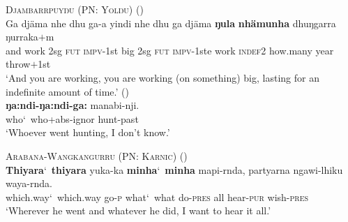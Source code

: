 \documentclass{article}
\begin{document}
\begin{exe}
  \ex \textsc{Djambarrpuyŋu (PN: Yolŋu)} (\citealt[393]{wilkinson91})\\
  \gll %
  Ga     djäma    nhe    dhu    ga-a        yindi    nhe    dhu    ga     djäma    \textbf{ŋula}        \textbf{nhämunha}    dhuŋgarra    ŋurraka$+$m\\
  and    work    2sg    \textsc{fut}    \textsc{impv}-1st    big    2sg    \textsc{fut}    \textsc{impv}-1ste   work    \textsc{indef2}    how.many    year        throw$+$1st\\
  \glt `And you are working, you are working (on something) big, lasting for an indefinite amount of time.'
   (\citealt[271]{donaldson80}) \\
\gll \textbf{ŋa:ndi-ŋa:ndi-ga:} manabi-nji.\\
who\char`~who+{\sc abs}-{\sc ignor} hunt-{\sc past}\\
\glt `Whoever went hunting, I don't know.' 

  
  \ex \textsc{Arabana-Wangkangurru (PN: Karnic)} (\citealt[129]{hercus94})\\
  \gll \textbf{Thiyara}\char`~\textbf{thiyara} yuka-ka \textbf{minha}\char`~\textbf{minha} mapi-rnda, partyarna ngawi-lhiku waya-rnda.\\
  which.way\char`~which.way go-\textsc{p} what\char`~what do-\textsc{pres} all hear-\textsc{pur} wish-\textsc{pres}\\
  \glt `Wherever he went and whatever he did, I want to hear it all.' %
\end{exe}
\end{document}
